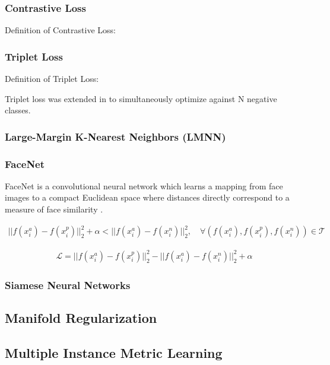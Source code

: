 	\subsubsection{Contrastive Loss}
	Definition of Contrastive Loss:
	
	
	\subsubsection{Triplet Loss}
	
	Definition of Triplet Loss:
	
	Triplet loss was extended in \citep{Sohn2016NPairLoss} to simultaneously optimize against N negative classes.

		\subsubsection{Large-Margin K-Nearest Neighbors (LMNN)}
		
		\subsubsection{FaceNet}
		
		FaceNet is a convolutional neural network which learns a mapping from face images to a compact Euclidean space where distances directly correspond to a measure of face similarity \citep{Schroff2015FaceNet}. 
		
		\begin{align}
			||f(x^{a}_{i}) - f(x^{p}_{i})||^{2}_{2} + \alpha < ||f(x^{a}_{i}) - f(x^{n}_{i})||^{2}_{2}, \quad \forall (f(x^{a}_{i}),f(x^{p}_{i}),f(x^{n}_{i})) \in \mathcal{T}
		\end{align} 
	
		\begin{align}
			\mathcal{L} = ||f(x^{a}_{i}) - f(x^{p}_{i})||^{2}_{2} -||f(x^{a}_{i}) - f(x^{n}_{i})||^{2}_{2} + \alpha
		\end{align}
		
		
		\subsubsection{Siamese Neural Networks}
	
	\subsection{Manifold Regularization}
	
	\subsection{Multiple Instance Metric Learning}



